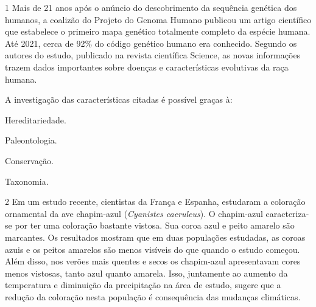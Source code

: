 {{


\num{1}  Mais de 21 anos após o anúncio do descobrimento da sequência genética
  dos humanos, a coalizão do Projeto do Genoma Humano publicou um artigo
  científico que estabelece o primeiro mapa genético totalmente completo
  da espécie humana. Até 2021, cerca de 92\% do código genético humano
  era conhecido. Segundo os autores do estudo, publicado na revista
  científica Science, as novas informações trazem dados importantes
  sobre doenças e características evolutivas da raça humana.


A investigação das características citadas é possível graças à:

\begin{escolha}
\item
  Hereditariedade.
\item
  Paleontologia.
\item
  Conservação.
\item
  Taxonomia.
\end{escolha}


\num{2}  Em um estudo recente, cientistas da França e Espanha, estudaram a
  coloração ornamental da ave chapim-azul (\emph{Cyanistes caeruleus}).
  O chapim-azul caracteriza-se por ter uma coloração bastante vistosa.
  Sua coroa azul e peito amarelo são marcantes. Os resultados mostram
  que em duas populações estudadas, as coroas azuis e os peitos amarelos
  são menos visíveis do que quando o estudo começou. Além disso, nos
  verões mais quentes e secos os chapim-azul apresentavam cores menos
  vistosas, tanto azul quanto amarela. Isso, juntamente ao aumento da
  temperatura e diminuição da precipitação na área de estudo, sugere que
  a redução da coloração nesta população é consequência das mudanças
  climáticas.

}}
